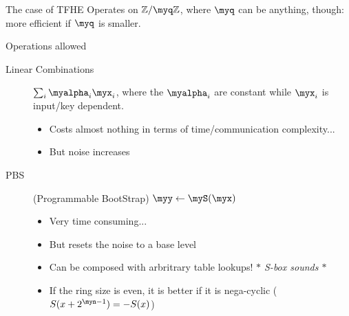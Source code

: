 \documentclass[presentation,aspectratio=1610]{beamer}
\begin{document}
\begin{frame}{The case of TFHE}
  Operates on $\Zmod{\myq}$, where $\myq$ can be anything, though:
  more efficient if $\myq$ is smaller.
  
  \begin{exampleblock}{Operations allowed}
    \begin{description}
    \item[Linear Combinations] $\sum_i \myalpha_i \myx_i$, where the $\myalpha_i$ are constant while $\myx_i$ is input/key dependent.

      \begin{itemize}
      \item Costs almost nothing in terms of time/communication complexity...
      \item But \alert{noise} increases
      \end{itemize}
      \pause
    \item[PBS] (\alert{P}rogrammable \alert{B}oot\alert{S}trap) \hspace{0.5cm} $\myy \gets \myS(\myx)$
      \begin{itemize}
      \item Very time consuming...
      \item But resets the noise to a \alert{base level} \pause
      \item Can be composed with \alert{arbritrary table lookups!} \pause \hfill {\emph{\color{gray}$*$ S-box sounds $*$}}
      \item If the ring size is even, it is better if it is \alert{nega-cyclic} ($S(x + 2^{\myn-1}) = - S(x)$)
      \end{itemize}
    \end{description}
  \end{exampleblock}
\end{frame}
\end{document}
